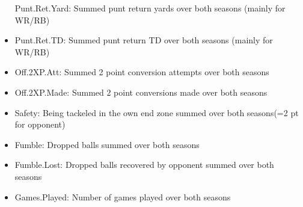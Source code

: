 \documentclass[]{article}
\begin{document}
\begin{itemize}
  Punt.Ret.Yard: Summed punt return yards over both seasons (mainly for
  WR/RB)
\item
  Punt.Ret.TD: Summed punt return TD over both seasons (mainly for
  WR/RB)
\item
  Off.2XP.Att: Summed 2 point conversion attempts over both seasons
\item
  Off.2XP.Made: Summed 2 point conversions made over both seasons
\item
  Safety: Being tackeled in the own end zone summed over both seasons(=2
  pt for opponent)
\item
  Fumble: Dropped balls summed over both seasons
\item
  Fumble.Lost: Dropped balls recovered by opponent summed over both
  seasons
\item
  Games.Played: Number of games played over both seasons
\end{itemize}
\end{document}
